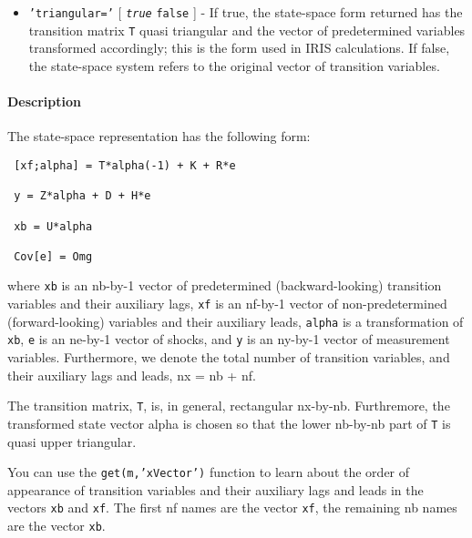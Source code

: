  \begin{itemize}
 \item
   \texttt{'triangular='} {[} \emph{\texttt{true}} \textbar{}
   \texttt{false} {]} - If true, the state-space form returned has the
   transition matrix \texttt{T} quasi triangular and the vector of
   predetermined variables transformed accordingly; this is the form used
   in IRIS calculations. If false, the state-space system refers to the
   original vector of transition variables.
 \end{itemize}
 
 \paragraph{Description}
 
 The state-space representation has the following form:
 
 \begin{verbatim}
 [xf;alpha] = T*alpha(-1) + K + R*e
 
 y = Z*alpha + D + H*e
 
 xb = U*alpha
 
 Cov[e] = Omg
 \end{verbatim}
 
 where \texttt{xb} is an nb-by-1 vector of predetermined
 (backward-looking) transition variables and their auxiliary lags,
 \texttt{xf} is an nf-by-1 vector of non-predetermined (forward-looking)
 variables and their auxiliary leads, \texttt{alpha} is a transformation
 of \texttt{xb}, \texttt{e} is an ne-by-1 vector of shocks, and
 \texttt{y} is an ny-by-1 vector of measurement variables. Furthermore,
 we denote the total number of transition variables, and their auxiliary
 lags and leads, nx = nb + nf.
 
 The transition matrix, \texttt{T}, is, in general, rectangular nx-by-nb.
 Furthremore, the transformed state vector alpha is chosen so that the
 lower nb-by-nb part of \texttt{T} is quasi upper triangular.
 
 You can use the \texttt{get(m,'xVector')} function to learn about the
 order of appearance of transition variables and their auxiliary lags and
 leads in the vectors \texttt{xb} and \texttt{xf}. The first nf names are
 the vector \texttt{xf}, the remaining nb names are the vector
 \texttt{xb}.


